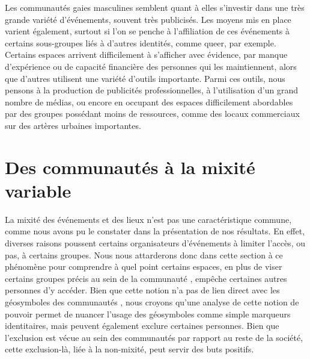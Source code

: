 Les communautés gaies masculines semblent quant à elles s'investir dans une très grande variété d'événements, souvent très publicisés.
Les moyens mis en place varient également, surtout si l'on se penche à l'affiliation de ces événements à certains sous-groupes liés à d'autres identités, comme queer, par exemple.
Certains espaces arrivent difficilement à s'afficher avec évidence, par manque d'expérience ou de capacité financière des personnes qui les maintiennent, alors que d'autres utilisent une variété d'outils importante.
Parmi ces outils, nous pensons à la production de publicités professionnelles, à l'utilisation d'un grand nombre de médias, ou encore en occupant des espaces difficilement abordables par des groupes possédant moins de ressources, comme des locaux commerciaux sur des artères urbaines importantes.

\section{Des communautés à la mixité variable}
La mixité des événements et des lieux \lgbt{} n'est pas une caractéristique commune, comme nous avons pu le constater dans la présentation de nos résultats.
En effet, diverses raisons poussent certains organisateurs d'événements à limiter l'accès, ou pas, à certains groupes.
Nous nous attarderons donc dans cette section à ce phénomène pour comprendre à quel point certains espaces, en plus de viser certains groupes précis au sein de la communauté \lgbt{}, empêche certaines autres personnes d'y accéder.
Bien que cette notion n'a pas de lien direct avec les géosymboles des communautés \lgbt{}, nous croyons qu'une analyse de cette notion de pouvoir permet de nuancer l'usage des géosymboles comme simple marqueurs identitaires, mais peuvent également exclure certaines personnes.
Bien que l'exclusion est vécue au sein des communautés \lgbt{} par rapport au reste de la société, cette exclusion-là, liée à la non-mixité, peut servir des buts positifs.


